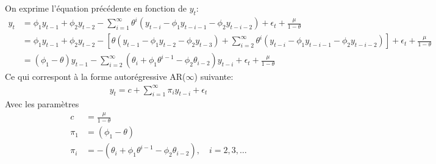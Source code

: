 \begin{solution}{2.7}
\begin{enumerate}
  On exprime l'équation précédente en fonction de $y_t$:
  \begin{align*}
    y_t &= \phi_1 y_{t-1} + \phi_2 y_{t-2} - \sum_{i=1}^{\infty} \theta^i \left(y_{t-i} - \phi_1 y_{t-i-1} - \phi_2 y_{t-i-2} \right) + \epsilon_t + \frac{\mu}{1-\theta} \\
    &= \phi_1 y_{t-1} + \phi_2 y_{t-2} - \left[\theta\left(y_{t-1}-\phi_1 y_{t-2} - \phi_2 y_{t-3} \right) + \sum_{i=2}^{\infty} \theta^i \left(y_{t-i} - \phi_1 y_{t-i-1} - \phi_2 y_{t-i-2} \right)\right] + \epsilon_t + \frac{\mu}{1-\theta}  \\
    &= (\phi_1 - \theta) y_{t-1} - \sum_{i=2}^{\infty} \left(\theta_i+\phi_1\theta^{i-1} - \phi_2\theta_{i-2}\right) y_{t-i} + \epsilon_t + \frac{\mu}{1-\theta}
  \end{align*}
  Ce qui correspont à la forme autorégressive AR($\infty$) suivante:
  \begin{align*}
    y_t = c + \sum_{i=1}^{\infty} \pi_i y_{t-i} + \epsilon_t
  \end{align*}
  Avec les paramètres
  \begin{align*}
    c &= \frac{\mu}{1-\theta} \\
    \pi_1 &= (\phi_1 - \theta) \\
    \pi_i &= -\left(\theta_i+\phi_1\theta^{i-1} - \phi_2\theta_{i-2}\right),\quad i=2,3,\ldots
  \end{align*}
\end{enumerate}
\end{solution}
